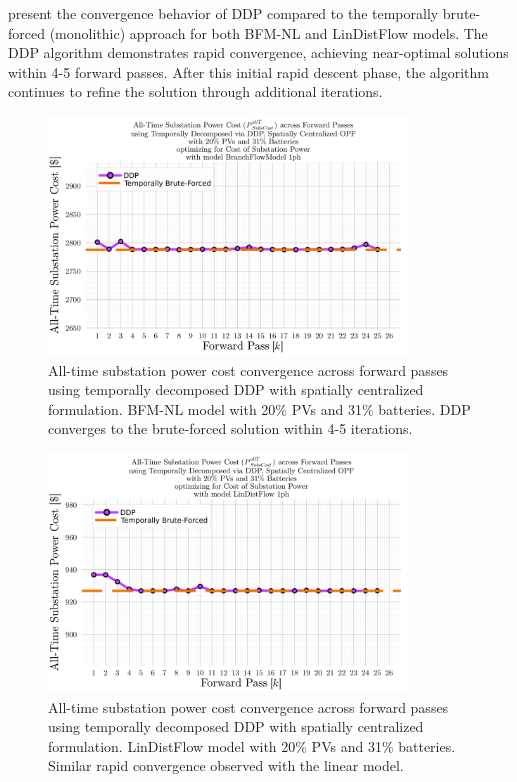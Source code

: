 present the convergence behavior of DDP compared to the temporally brute-forced (monolithic) approach for both BFM-NL and LinDistFlow models. The DDP algorithm demonstrates rapid convergence, achieving near-optimal solutions within 4-5 forward passes. After this initial rapid descent phase, the algorithm continues to refine the solution through additional iterations.

\begin{figure}[h]
    \centering
    \includegraphics[width=0.85\textwidth]{figures/SubstationPowerCostAllTime_vs_k_26_for_subsPowerCost_min_with_scd_alpha_8_994_gamma_0_0_via_tmprl_dcmpsd_spat_centr_system_with_bfm_NL_1ph.png}
    \caption{All-time substation power cost convergence across forward passes using temporally decomposed DDP with spatially centralized formulation. BFM-NL model with 20\% PVs and 31\% batteries. DDP converges to the brute-forced solution within 4-5 iterations.}
    \label{fig:ddp-convergence-bfm}
\end{figure}

\begin{figure}[h]
    \centering
    \includegraphics[width=0.85\textwidth]{figures/SubstationPowerCostAllTime_vs_k_26_for_subsPowerCost_min_with_scd_alpha_3_033_gamma_0_0_via_tmprl_dcmpsd_spat_centr_system_with_ldf_1ph.png}
    \caption{All-time substation power cost convergence across forward passes using temporally decomposed DDP with spatially centralized formulation. LinDistFlow model with 20\% PVs and 31\% batteries. Similar rapid convergence observed with the linear model.}
    \label{fig:ddp-convergence-ldf}
\end{figure}


